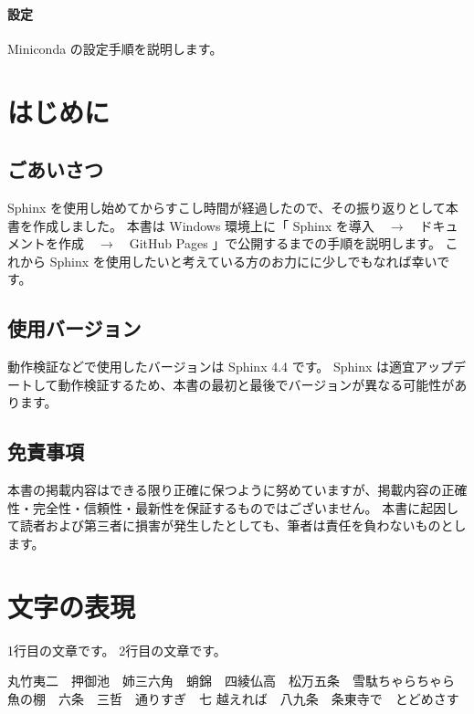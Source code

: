 \documentclass[letterpaper,10pt,dvipdfmx]{sphinxmanual}
\begin{document}
\subsubsection{設定}
\label{\detokenize{chapter2/uo:id2}}
\sphinxAtStartPar
Miniconda の設定手順を説明します。

\sphinxstepscope


\chapter{はじめに}
\label{\detokenize{chap3:id1}}\label{\detokenize{chap3::doc}}

\section{ごあいさつ}
\label{\detokenize{chap3:id2}}
\sphinxAtStartPar
Sphinx を使用し始めてからすこし時間が経過したので、その振り返りとして本書を作成しました。
本書は Windows 環境上に「 Sphinx を導入　\(\rightarrow\)　ドキュメントを作成　\(\rightarrow\)　GitHub Pages 」で公開するまでの手順を説明します。
これから Sphinx を使用したいと考えている方のお力にに少しでもなれば幸いです。


\section{使用バージョン}
\label{\detokenize{chap3:id3}}
\sphinxAtStartPar
動作検証などで使用したバージョンは Sphinx 4.4 です。
Sphinx は適宜アップデートして動作検証するため、本書の最初と最後でバージョンが異なる可能性があります。


\section{免責事項}
\label{\detokenize{chap3:id4}}
\sphinxAtStartPar
本書の掲載内容はできる限り正確に保つように努めていますが、掲載内容の正確性・完全性・信頼性・最新性を保証するものではございません。
本書に起因して読者および第三者に損害が発生したとしても、筆者は責任を負わないものとします。

\sphinxstepscope


\chapter{文字の表現}
\label{\detokenize{chap4:id1}}\label{\detokenize{chap4::doc}}
\sphinxAtStartPar
1行目の文章です。
2行目の文章です。

\sphinxAtStartPar
丸竹夷二　押御池　姉三六角　蛸錦　四綾仏高　松万五条　雪駄ちゃらちゃら　魚の棚　六条　三哲　通りすぎ　七 越えれば　八九条　条東寺で　とどめさす
\end{document}
